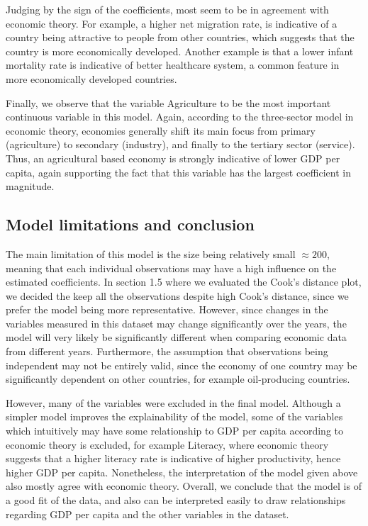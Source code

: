 \documentclass[12pt,a4paper]{article}
\renewcommand\texttt[1]{{\ttfamily\color{ttcolor}#1}}
\begin{document}
Judging by the sign of the coefficients, most seem to be in agreement with economic theory. For example, a higher net migration rate, is indicative of a country being attractive to people from other countries, which suggests that the country is more economically developed. Another example is that a lower infant mortality rate is indicative of better healthcare system, a common feature in more economically developed countries.

Finally, we observe that the variable \texttt{Agriculture} to be the most important continuous variable in this model. Again, according to the three-sector model in economic theory, economies generally shift its main focus from primary (agriculture) to secondary (industry), and finally to the tertiary sector (service). Thus, an agricultural based economy is strongly indicative of lower GDP per capita, again supporting the fact that this variable has the largest coefficient in magnitude.

\subsection{Model limitations and conclusion}
The main limitation of this model is the size being relatively small $\approx 200$, meaning that each individual observations may have a high influence on the estimated coefficients. In section 1.5 where we evaluated the Cook's distance plot, we decided the keep all the observations despite high Cook's distance, since we prefer the model being more representative. However, since changes in the variables measured in this dataset may change significantly over the years, the model will very likely be significantly different when comparing economic data from different years. Furthermore, the assumption that observations being independent may not be entirely valid, since the economy of one country may be significantly dependent on other countries, for example oil-producing countries. 

However, many of the variables were excluded in the final model. Although a simpler model improves the explainability of the model, some of the variables which intuitively may have some relationship to GDP per capita according to economic theory is excluded, for example \texttt{Literacy}, where economic theory suggests that a higher literacy rate is indicative of higher productivity, hence higher GDP per capita. Nonetheless, the interpretation of the model given above also mostly agree with economic theory. Overall, we conclude that the model is of a good fit of the data, and also can be interpreted easily to draw relationships regarding GDP per capita and the other variables in the dataset.
\end{document}
